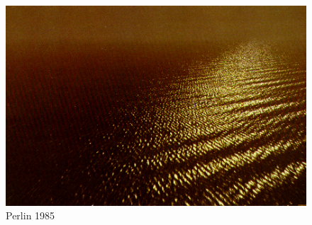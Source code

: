 \begin{figure}
 \centering
 \includegraphics[scale=0.25]{figures/An_Image_Synthesizer_-_Perlin_1985-021.png}
 \caption{Perlin 1985}
\end{figure}

